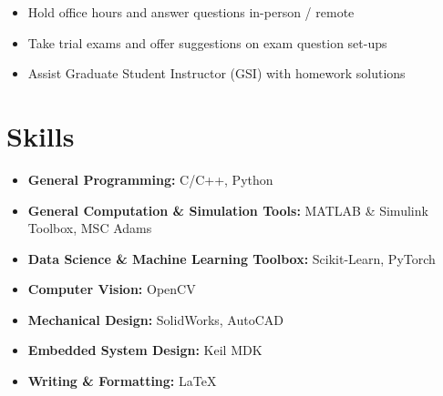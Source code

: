 \documentclass[letter,12pt]{article}
\begin{document}
\begin{itemize}[
    rightmargin=2cm
]
    \setlength{\itemsep}{1pt}
    \setlength{\parskip}{0pt}
    \setlength{\parsep}{0pt}
    \item{\small Hold office hours and answer questions in-person / remote}
    \item{\small Take trial exams and offer suggestions on exam question set-ups}
    \item{\small Assist Graduate Student Instructor (GSI) with homework solutions}

\end{itemize}
        




\section{Skills}

    \begin{itemize}
        \setlength{\itemsep}{1pt}
        \setlength{\parskip}{0pt}
        \setlength{\parsep}{0pt}
        \item \textbf{General Programming:} C/C++, Python
        \item \textbf{General Computation \& Simulation Tools:} MATLAB \& Simulink Toolbox, MSC Adams
        \item \textbf{Data Science \& Machine Learning Toolbox:} Scikit-Learn, PyTorch
        \item \textbf{Computer Vision:} OpenCV
        \item \textbf{Mechanical Design:} SolidWorks, AutoCAD
        \item \textbf{Embedded System Design:} Keil MDK
        \item \textbf{Writing \& Formatting:} LaTeX
    \end{itemize}
    
\end{document}
